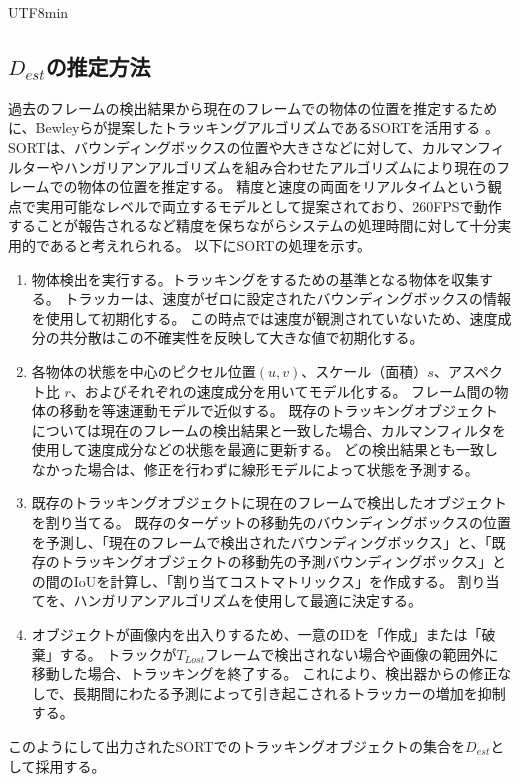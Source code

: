 \documentclass[conference, dvipdfmx]{IEEEtran}
\begin{document}
\begin{CJK}{UTF8}{min}
\subsection{$D_{est}$の推定方法}
過去のフレームの検出結果から現在のフレームでの物体の位置を推定するために、Bewleyらが提案したトラッキングアルゴリズムであるSORTを活用する \cite{SORT}。
SORTは、バウンディングボックスの位置や大きさなどに対して、カルマンフィルターやハンガリアンアルゴリズムを組み合わせたアルゴリズムにより現在のフレームでの物体の位置を推定する。
精度と速度の両面をリアルタイムという観点で実用可能なレベルで両立するモデルとして提案されており、260FPSで動作することが報告されるなど精度を保ちながらシステムの処理時間に対して十分実用的であると考えれられる。
以下にSORTの処理を示す。
\begin{enumerate}
    \item 物体検出を実行する。トラッキングをするための基準となる物体を収集する。
    トラッカーは、速度がゼロに設定されたバウンディングボックスの情報を使用して初期化する。
    この時点では速度が観測されていないため、速度成分の共分散はこの不確実性を反映して大きな値で初期化する。 
    \item 各物体の状態を中心のピクセル位置$(u,v)$、スケール（面積）$s$、アスペクト比 $r$、およびそれぞれの速度成分を用いてモデル化する。
    フレーム間の物体の移動を等速運動モデルで近似する。
    既存のトラッキングオブジェクトについては現在のフレームの検出結果と一致した場合、カルマンフィルタを使用して速度成分などの状態を最適に更新する。
    どの検出結果とも一致しなかった場合は、修正を行わずに線形モデルによって状態を予測する。
    \item 既存のトラッキングオブジェクトに現在のフレームで検出したオブジェクトを割り当てる。
    既存のターゲットの移動先のバウンディングボックスの位置を予測し、「現在のフレームで検出されたバウンディングボックス」と、「既存のトラッキングオブジェクトの移動先の予測バウンディングボックス」との間のIoUを計算し、「割り当てコストマトリックス」を作成する。
    割り当てを、ハンガリアンアルゴリズムを使用して最適に決定する。
    \item オブジェクトが画像内を出入りするため、一意のIDを「作成」または「破棄」する。
    トラックが$T_{Lost}$フレームで検出されない場合や画像の範囲外に移動した場合、トラッキングを終了する。
    これにより、検出器からの修正なしで、長期間にわたる予測によって引き起こされるトラッカーの増加を抑制する。
\end{enumerate}

このようにして出力されたSORTでのトラッキングオブジェクトの集合を$D_{est}$として採用する。


\end{CJK}
\end{document}
